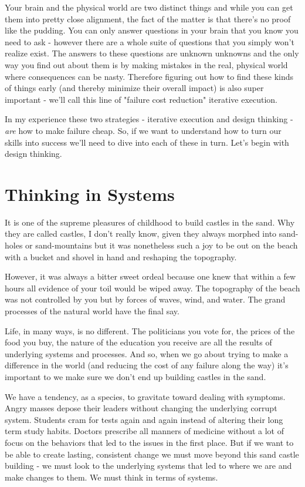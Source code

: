\documentclass[11pt,a5paper]{book}
\begin{document}
Your brain and the physical world are two distinct things and while you can get them into pretty close alignment, the fact of the matter is that there's no proof like the pudding. You can only answer questions in your brain that you know you need to ask - however there are a whole suite of questions that you simply won't realize exist. The answers to these questions are unknown unknowns and the only way you find out about them is by making mistakes in the real, physical world where consequences can be nasty. Therefore figuring out how to find these kinds of things early (and thereby minimize their overall impact) is also super important - we'll call this line of "failure cost reduction" iterative execution.
\newline

In my experience these two strategies - iterative execution and design thinking - \textit{are} how to make failure cheap. So, if we want to understand how to turn our skills into success we'll need to dive into each of these in turn. Let's begin with design thinking.

\section{Thinking in Systems}
It is one of the supreme pleasures of childhood to build castles in the sand. Why they are called castles, I don't really know, given they always morphed into sand-holes or sand-mountains but it was nonetheless such a joy to be out on the beach with a bucket and shovel in hand and reshaping the topography. 
\newline

However, it was always a bitter sweet ordeal because one knew that within a few hours all evidence of your toil would be wiped away. The topography of the beach was not controlled by you but by forces of waves, wind, and water. The grand processes of the natural world have the final say.
\newline

Life, in many ways, is no different. The politicians you vote for, the prices of the food you buy, the nature of the education you receive are all the results of underlying systems and processes. And so, when we go about trying to make a difference in the world (and reducing the cost of any failure along the way) it's important to we make sure we don't end up building castles in the sand. 
\newline

We have a tendency, as a species, to gravitate toward dealing with symptoms. Angry masses depose their leaders without changing the underlying corrupt system. Students cram for tests again and again instead of altering their long term study habits. Doctors prescribe all manners of medicine without a lot of focus on the behaviors that led to the issues in the first place. But if we want to be able to create lasting, consistent change we must move beyond this sand castle building - we must look to the underlying systems that led to where we are and make changes to them. We must think in terms of systems.
\newline
\end{document}
